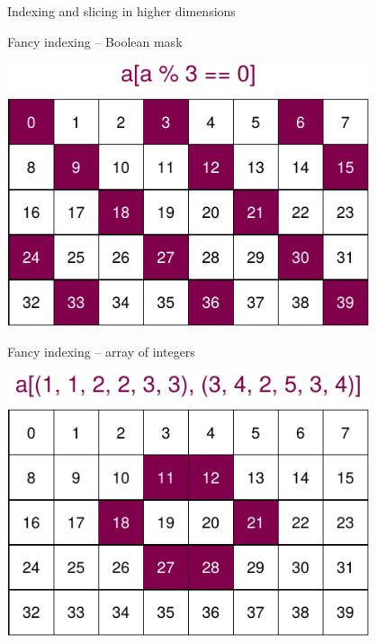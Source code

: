 \documentclass[svgnames]{beamer}
\begin{document}
\begin{frame}{Indexing and slicing in higher dimensions}
\begin{center}
 \end{center}
\end{frame}

\begin{frame}{Fancy indexing -- Boolean mask}
 \begin{center}
  \includegraphics[width=0.8\textwidth]{arraygraphics_6}
 \end{center}
\end{frame}

\begin{frame}{Fancy indexing -- array of integers}
 \begin{center}
  \includegraphics[width=0.8\textwidth]{arraygraphics_7}
 \end{center}
\end{frame}
\end{document}
